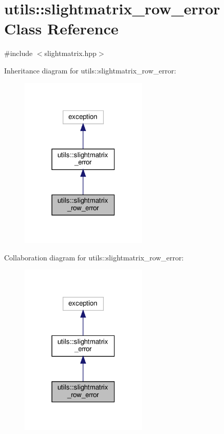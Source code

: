 \hypertarget{classutils_1_1slightmatrix__row__error}{}\section{utils\+:\+:slightmatrix\+\_\+row\+\_\+error Class Reference}
\label{classutils_1_1slightmatrix__row__error}


{\ttfamily \#include $<$slightmatrix.\+hpp$>$}



Inheritance diagram for utils\+:\+:slightmatrix\+\_\+row\+\_\+error\+:
\nopagebreak
\begin{figure}[H]
\begin{center}
\leavevmode
\includegraphics[width=171pt]{classutils_1_1slightmatrix__row__error__inherit__graph}
\end{center}
\end{figure}


Collaboration diagram for utils\+:\+:slightmatrix\+\_\+row\+\_\+error\+:
\nopagebreak
\begin{figure}[H]
\begin{center}
\leavevmode
\includegraphics[width=171pt]{classutils_1_1slightmatrix__row__error__coll__graph}
\end{center}
\end{figure}


